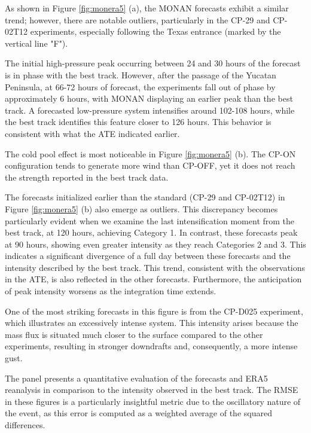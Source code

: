 As shown in Figure \ref{fig:monera5} (a), the MONAN forecasts exhibit a similar trend; however, there are notable outliers, particularly in the CP-29 and CP-02T12 experiments, especially following the Texas entrance (marked by the vertical line "F").

The initial high-pressure peak occurring between 24 and 30 hours of the forecast is in phase with the best track. However, after the passage of the Yucatan Peninsula, at 66-72 hours of forecast, the experiments fall out of phase by approximately 6 hours, with MONAN displaying an earlier peak than the best track. A forecasted low-pressure system intensifies around 102-108 hours, while the best track identifies this feature closer to 126 hours. This behavior is consistent with what the ATE indicated earlier.

The cold pool effect is most noticeable in Figure \ref{fig:monera5} (b). The CP-ON configuration tends to generate more wind than CP-OFF, yet it does not reach the strength reported in the best track data.

The forecasts initialized earlier than the standard (CP-29 and CP-02T12) in Figure \ref{fig:monera5}  (b) also emerge as outliers. This discrepancy becomes particularly evident when we examine the last intensification moment from the best track, at 120 hours, achieving Category 1. In contrast, these forecasts peak at 90 hours, showing even greater intensity as they reach Categories 2 and 3. This indicates a significant divergence of a full day between these forecasts and the intensity described by the best track. This trend, consistent with the observations in the ATE, is also reflected in the other forecasts. Furthermore, the anticipation of peak intensity worsens as the integration time extends.

One of the most striking forecasts in this figure is from the CP-D025 experiment, which illustrates an excessively intense system. This intensity arises because the mass flux is situated much closer to the surface compared to the other experiments, resulting in stronger downdrafts and, consequently, a more intense gust.

The panel presents a quantitative evaluation of the forecasts and ERA5 reanalysis in comparison to the intensity observed in the best track. The RMSE in these figures is a particularly insightful metric due to the oscillatory nature of the event, as this error is computed as a weighted average of the squared differences.

